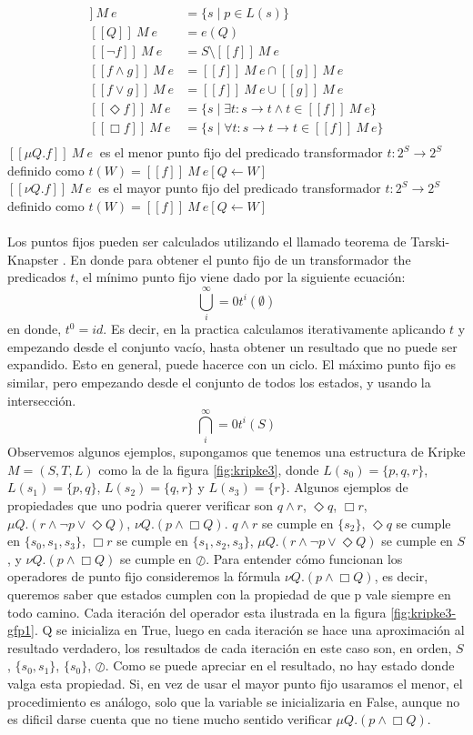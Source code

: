 \begin{align*}
 [[p]]\ M\ e &= \{s \mid p \in L(s)\}  \\
 [[Q]]\ M\ e &= e(Q) \\
 [[\neg f]]\ M\ e &= S \setminus [[f]]\ M\ e \\
 [[f \land g]]\ M\ e &= [[f]]\ M\ e \cap [[g]]\ M\ e \\
 [[f \lor g]]\ M\ e &= [[f]]\ M\ e \cup [[g]]\ M\ e \\
 [[\Diamond f]]\ M\ e &= \{s \mid \exists t : s \to t \land t \in [[f]]\ M\ e\} \\
 [[\Box f]]\ M\ e &= \{s \mid \forall t : s \to t  \rightarrow t \in [[f]]\ M\ e\} \\
\end{align*}
$[[\mu Q. f]] \ M\ e\ $ es el menor punto fijo del predicado transformador $t:2^{S} \to 2^{S}$ definido como $t(W) = [[f]]\ M\ e[Q \gets W] $ \\
$[[\nu Q. f]] \ M\ e\ $ es el mayor punto fijo del predicado transformador $t:2^{S} \to 2^{S}$ definido como $t(W) = [[f]]\ M\ e[Q \gets W] $ \\
\\
Los puntos fijos pueden ser calculados utilizando el llamado teorema de Tarski-Knapster \cite{Tarski:17}. En donde para obtener el punto fijo de un transformador the predicados $t$, el mínimo punto fijo viene dado por la siguiente ecuación:
$$
	\bigcup^\infty_i=0 t^i(\emptyset)
$$
en donde, $t^0 = id$. Es decir, en la practica calculamos iterativamente aplicando $t$ y empezando desde el conjunto vacío, hasta obtener un resultado que no puede ser expandido. Esto en general, puede hacerce con un ciclo. El máximo punto fijo es similar, pero empezando desde el conjunto de
todos los estados, y usando la intersección.
$$
	\bigcap^\infty_i=0 t^i(S)
$$
Observemos algunos ejemplos, supongamos que tenemos una estructura de Kripke $M = (S,T,L)$ como la de la figura \ref{fig:kripke3}, donde $L(s_{0}) = \{p,q,r\}$, $L(s_{1}) = \{p,q\}$, $L(s_{2}) = \{q,r\}$ y $L(s_{3}) = \{r\}$. Algunos ejemplos de propiedades que uno podria querer verificar son $q \land r$, $\Diamond q$, $\Box r$, $\mu Q. (r \land \neg p \lor \Diamond Q)$, $\nu Q. (p \land \Box Q)$. $q \land r$ se cumple en $\{s_{2}\}$, $\Diamond q$ se cumple en $\{s_{0},s_{1},s_{3}\}$, $\Box r$ se cumple en $\{s_{1},s_{2},s_{3}\}$, $\mu Q. (r \land \neg p \lor \Diamond Q)$ se cumple en $S$, y $\nu Q. (p \land \Box Q)$ se cumple en $\oslash$. Para entender cómo funcionan los operadores de punto fijo consideremos la fórmula $\nu Q. (p \land \Box Q)$, es decir, queremos saber que estados cumplen con la propiedad de que p vale siempre en todo camino. Cada iteración del operador esta ilustrada en la figura \ref{fig:kripke3-gfp1}. Q se inicializa en True, luego en cada iteración se hace una aproximación al resultado verdadero, los resultados de cada iteración en este caso son, en orden, $S$, $\{s_{0},s_{1}\}$, $\{s_{0}\}$, $\oslash$. Como se puede apreciar en el resultado, no hay estado donde valga esta propiedad. Si, en vez de usar el mayor punto fijo usaramos el menor, el procedimiento es análogo, solo que la variable se inicializaria en False, aunque no es dificil darse cuenta que no tiene mucho sentido verificar $\mu Q.(p \land \Box Q)$.

